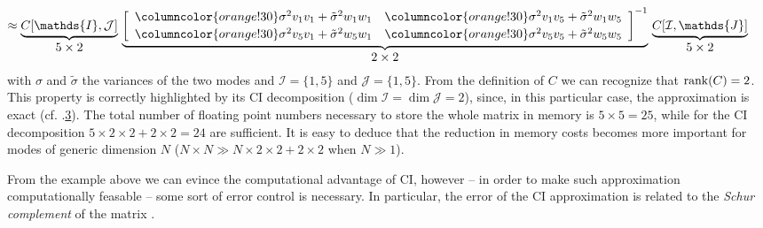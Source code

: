 \begin{example}
\begin{gather}
\begin{aligned}
\begin{tikzpicture}[baseline=-0.5ex,
			every node/.style={inner sep=1pt,font=\small}]
		\end{tikzpicture}
	\end{aligned}
	 \\[1.2em]
	 \nonumber
	 \hspace*{-0.6cm}%
	  \approx
	   \underbrace{%
	  C[\mathds{I} , \mathcal{J}]}_{\displaystyle 5 \times 2}
	\,
	\underbrace{%
	  \left[ \begin{array}{>{\columncolor{orange!30}}c>{\columncolor{orange!30}}c}
		\sigma^{2}v_1v_1+ \tilde\sigma^{2}w_1w_1 & \sigma^{2}v_1v_5+ \tilde\sigma^{2}w_1w_5 \\[0.2em]
		\sigma^{2}v_5v_1+ \tilde\sigma^{2}w_5w_1 & \sigma^{2}v_5v_5+ \tilde\sigma^{2}w_5w_5
	  \end{array}\right]^{-1}}_{\displaystyle 2 \times 2}
	  \,
	  \underbrace{%
	  C[\mathcal{I} , \mathds{J}]}_{\displaystyle 5 \times 2} 
\end{gather}
with $\sigma$ and $\tilde{\sigma}$ the variances of the two modes and $\mathcal{I} = \{ 1,5\}$ and $\mathcal{J} = \{ 1,5\}$. From the definition of $C$ we can recognize that $\operatorname{rank}\!\left(C\right) = 2$. This property is correctly highlighted by its CI decomposition ($\dim \mathcal{I} = \dim \mathcal{J} = 2$), since, in this particular case, the approximation is exact (cf. .\hyperlink{cond:rankexact}{3}). The total number of floating point numbers necessary to store the whole matrix in memory is $5 \times 5 = 25$, while for the CI decomposition $5\times 2 \times 2 + 2\times 2 = 24$ are sufficient. It is easy to deduce that the reduction in memory costs becomes more important for modes of generic dimension $N$ ($N\times N \gg N \times 2 \times 2 + 2\times 2$ when $N \gg 1$).
\end{example}

From the example above we can evince the computational advantage of CI, however -- in order to make such approximation computationally feasable -- some sort of error control is necessary. 
In particular, the error of the CI approximation is related to the \textit{Schur complement} of the matrix \cite{Golub96}. 

